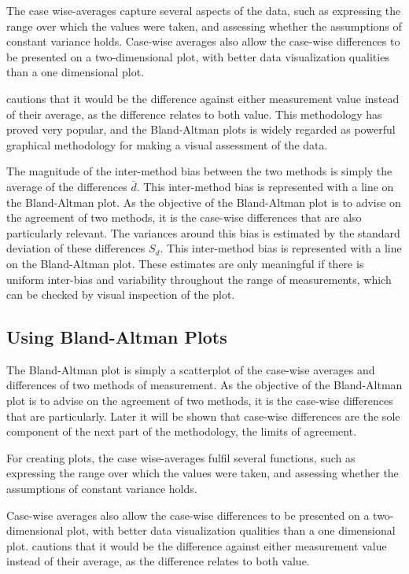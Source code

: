 \documentclass[Main.tex]{subfiles}
\begin{document}
The case wise-averages capture several aspects of the data, such as expressing the range over which the values were taken, and assessing whether the assumptions of constant variance holds.
Case-wise averages also allow the case-wise differences to be presented on a two-dimensional plot, with better data visualization qualities than a one dimensional plot. 

\citet{BA86} cautions that it would be the difference against either measurement value instead of their average, as the difference relates to both value. This methodology has proved very popular, and the Bland-Altman plots is widely regarded as powerful graphical methodology for making a visual assessment of the data.

The magnitude of the inter-method bias between the two methods is simply the average of the differences $\bar{d}$. This inter-method bias is represented with a line on the Bland-Altman plot. As the objective of the Bland-Altman plot is to advise on the agreement of two methods, it is the case-wise differences that are also particularly relevant. The variances around this bias is estimated by the standard deviation of these differences $S_{d}$. This inter-method bias is represented with a	line on the Bland-Altman plot. These estimates are only meaningful	if there is uniform inter-bias and variability throughout the range of measurements, which can be checked by visual inspection of the plot. 

\subsection{Using Bland-Altman Plots}
	
The Bland-Altman plot is simply a scatterplot of the case-wise
	averages and differences of two methods of measurement. As the
	objective of the Bland-Altman plot is to advise on the agreement
	of two methods, it is the case-wise differences that are particularly. Later it will be shown that case-wise differences are the sole component of the next part of the methodology, the
	limits of agreement.
	
For creating plots, the case wise-averages fulfil several
	functions, such as expressing the range over which the values were
	taken, and assessing whether the assumptions of constant variance
	holds. 
	
Case-wise averages also allow the case-wise differences to be presented on a two-dimensional plot, with better data visualization qualities than a one dimensional plot. \citet{BA86} cautions that it would be the difference against either measurement value instead of their average, as the difference
	relates to both value.
\end{document}
